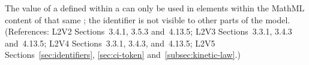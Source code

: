 The  value of a \Parameter defined within a \KineticLaw
can only be used in  elements within the MathML content
of that same \KineticLaw; the identifier is not visible to other
parts of the model.  (References: L2V2 Sections~3.4.1, 3.5.3 
and~4.13.5; L2V3 Sections~3.3.1, 3.4.3 and~4.13.5; L2V4 Sections~3.3.1, 3.4.3, and~4.13.5; L2V5 
Sections~\ref{sec:identifiers}, \ref{sec:ci-token}
and~\ref{subsec:kinetic-law}.)
